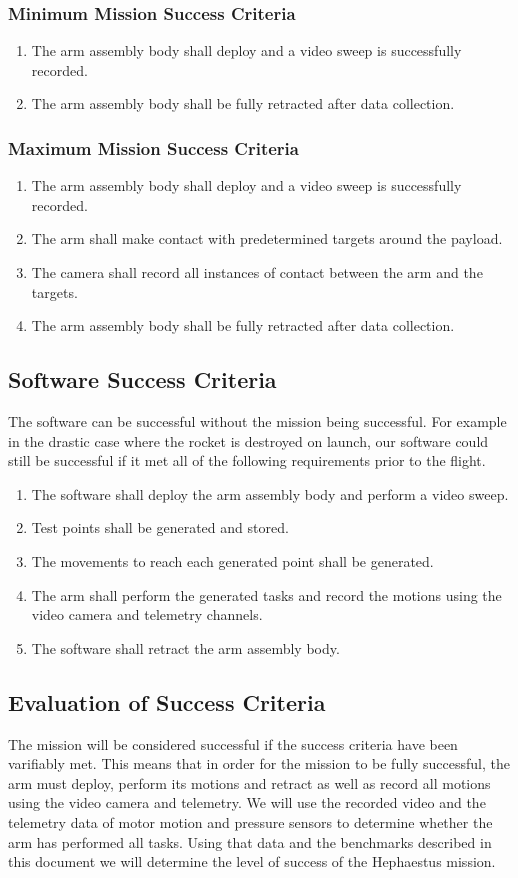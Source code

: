 \documentclass[letterpaper,10pt]{article}
\begin{document}
\subsubsection{Minimum Mission Success Criteria}
\begin{enumerate}
  \item The arm assembly body shall deploy and a video sweep is successfully
    recorded.
  \item The arm assembly body shall be fully retracted after data collection.
\end{enumerate}
\subsubsection{Maximum Mission Success Criteria}
\begin{enumerate}
  \item The arm assembly body shall deploy and a video sweep is successfully
    recorded.
  \item The arm shall make contact with predetermined targets around the
    payload.
  \item The camera shall record all instances of contact between the arm and the
    targets.
  \item The arm assembly body shall be fully retracted after data collection.
\end{enumerate}
\subsection{Software Success Criteria}
The software can be successful without the mission being successful. For example
in the drastic case where the rocket is destroyed on launch, our software could
still be successful if it met all of the following requirements prior to the
flight.
\begin{enumerate}
  \item The software shall deploy the arm assembly body and perform a video sweep.
  \item Test points shall be generated and stored.
  \item The movements to reach each generated point shall be generated.
  \item The arm shall perform the generated tasks and record the motions using
    the video camera and telemetry channels.
  \item The software shall retract the arm assembly body.
\end{enumerate}
\subsection{Evaluation of Success Criteria}
The mission will be considered successful if the success criteria have been
varifiably met. This means that in order for the mission to be fully successful,
the arm must deploy, perform its motions and retract as well as record all
motions using the video camera and telemetry. We will use the recorded video and
the telemetry data of motor motion and pressure sensors to determine whether the
arm has performed all tasks. Using that data and the benchmarks described in
this document we will determine the level of success of the Hephaestus mission.
\end{document}
